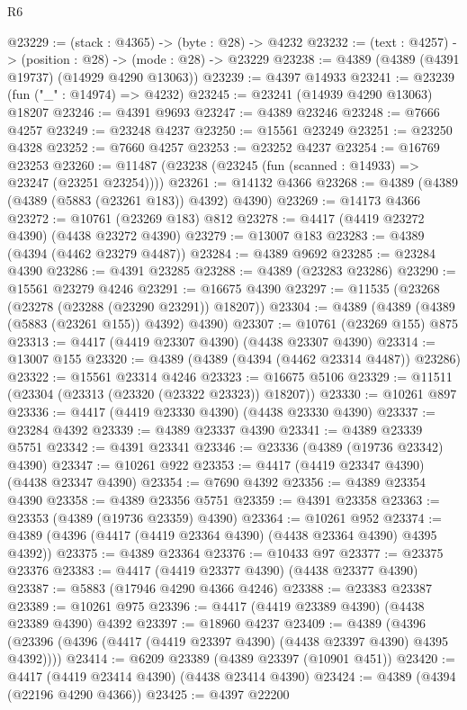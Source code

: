 \begin{lexlean}{R6}
\begin{coremodule}
@23229 := (stack : @4365) -> (byte : @28) -> @4232
@23232 := (text : @4257) -> (position : @28) -> (mode : @28) -> @23229
@23238 := @4389 (@4389 (@4391 @19737) (@14929 @4290 @13063))
@23239 := @4397 @14933
@23241 := @23239 (fun ("_" : @14974) => @4232)
@23245 := @23241 (@14939 @4290 @13063) @18207
@23246 := @4391 @9693
@23247 := @4389 @23246
@23248 := @7666 @4257
@23249 := @23248 @4237
@23250 := @15561 @23249
@23251 := @23250 @4328
@23252 := @7660 @4257
@23253 := @23252 @4237
@23254 := @16769 @23253
@23260 := @11487 (@23238 (@23245 (fun (scanned : @14933) => @23247 (@23251 @23254))))
@23261 := @14132 @4366
@23268 := @4389 (@4389 (@4389 (@5883 (@23261 @183)) @4392) @4390)
@23269 := @14173 @4366
@23272 := @10761 (@23269 @183) @812
@23278 := @4417 (@4419 @23272 @4390) (@4438 @23272 @4390)
@23279 := @13007 @183
@23283 := @4389 (@4394 (@4462 @23279 @4487))
@23284 := @4389 @9692
@23285 := @23284 @4390
@23286 := @4391 @23285
@23288 := @4389 (@23283 @23286)
@23290 := @15561 @23279 @4246
@23291 := @16675 @4390
@23297 := @11535 (@23268 (@23278 (@23288 (@23290 @23291)) @18207))
@23304 := @4389 (@4389 (@4389 (@5883 (@23261 @155)) @4392) @4390)
@23307 := @10761 (@23269 @155) @875
@23313 := @4417 (@4419 @23307 @4390) (@4438 @23307 @4390)
@23314 := @13007 @155
@23320 := @4389 (@4389 (@4394 (@4462 @23314 @4487)) @23286)
@23322 := @15561 @23314 @4246
@23323 := @16675 @5106
@23329 := @11511 (@23304 (@23313 (@23320 (@23322 @23323)) @18207))
@23330 := @10261 @897
@23336 := @4417 (@4419 @23330 @4390) (@4438 @23330 @4390)
@23337 := @23284 @4392
@23339 := @4389 @23337 @4390
@23341 := @4389 @23339 @5751
@23342 := @4391 @23341
@23346 := @23336 (@4389 (@19736 @23342) @4390)
@23347 := @10261 @922
@23353 := @4417 (@4419 @23347 @4390) (@4438 @23347 @4390)
@23354 := @7690 @4392
@23356 := @4389 @23354 @4390
@23358 := @4389 @23356 @5751
@23359 := @4391 @23358
@23363 := @23353 (@4389 (@19736 @23359) @4390)
@23364 := @10261 @952
@23374 := @4389 (@4396 (@4417 (@4419 @23364 @4390) (@4438 @23364 @4390) @4395 @4392))
@23375 := @4389 @23364
@23376 := @10433 @97
@23377 := @23375 @23376
@23383 := @4417 (@4419 @23377 @4390) (@4438 @23377 @4390)
@23387 := @5883 (@17946 @4290 @4366 @4246)
@23388 := @23383 @23387
@23389 := @10261 @975
@23396 := @4417 (@4419 @23389 @4390) (@4438 @23389 @4390) @4392
@23397 := @18960 @4237
@23409 := @4389
    (@4396 (@23396 (@4396 (@4417 (@4419 @23397 @4390) (@4438 @23397 @4390) @4395 @4392))))
@23414 := @6209 @23389 (@4389 @23397 (@10901 @451))
@23420 := @4417 (@4419 @23414 @4390) (@4438 @23414 @4390)
@23424 := @4389 (@4394 (@22196 @4290 @4366))
@23425 := @4397 @22200

\end{coremodule}
\end{lexlean}
